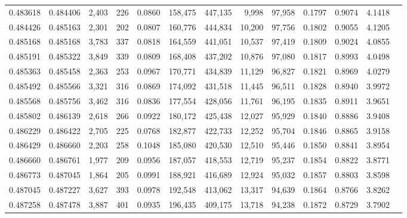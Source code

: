 \begin{tabular}{rrrrrrrrrrrrr}
0.483618 & 0.484406 & 2,403 &   226 &                                     0.0860 & 158,475 & 447,135 &   9,998 &  97,958 & 0.1797 & 0.9074 & 4.1418 \\
0.484426 & 0.485163 & 2,301 &   202 &                                     0.0807 & 160,776 & 444,834 &  10,200 &  97,756 & 0.1802 & 0.9055 & 4.1205 \\
0.485168 & 0.485168 & 3,783 &   337 &                                     0.0818 & 164,559 & 441,051 &  10,537 &  97,419 & 0.1809 & 0.9024 & 4.0855 \\
0.485191 & 0.485322 & 3,849 &   339 &                                     0.0809 & 168,408 & 437,202 &  10,876 &  97,080 & 0.1817 & 0.8993 & 4.0498 \\
0.485363 & 0.485458 & 2,363 &   253 &                                     0.0967 & 170,771 & 434,839 &  11,129 &  96,827 & 0.1821 & 0.8969 & 4.0279 \\
0.485492 & 0.485566 & 3,321 &   316 &                                     0.0869 & 174,092 & 431,518 &  11,445 &  96,511 & 0.1828 & 0.8940 & 3.9972 \\
0.485568 & 0.485756 & 3,462 &   316 &                                     0.0836 & 177,554 & 428,056 &  11,761 &  96,195 & 0.1835 & 0.8911 & 3.9651 \\
0.485802 & 0.486139 & 2,618 &   266 &                                     0.0922 & 180,172 & 425,438 &  12,027 &  95,929 & 0.1840 & 0.8886 & 3.9408 \\
0.486229 & 0.486422 & 2,705 &   225 &                                     0.0768 & 182,877 & 422,733 &  12,252 &  95,704 & 0.1846 & 0.8865 & 3.9158 \\
0.486429 & 0.486660 & 2,203 &   258 &                                     0.1048 & 185,080 & 420,530 &  12,510 &  95,446 & 0.1850 & 0.8841 & 3.8954 \\
0.486660 & 0.486761 & 1,977 &   209 &                                     0.0956 & 187,057 & 418,553 &  12,719 &  95,237 & 0.1854 & 0.8822 & 3.8771 \\
0.486773 & 0.487045 & 1,864 &   205 &                                     0.0991 & 188,921 & 416,689 &  12,924 &  95,032 & 0.1857 & 0.8803 & 3.8598 \\
0.487045 & 0.487227 & 3,627 &   393 &                                     0.0978 & 192,548 & 413,062 &  13,317 &  94,639 & 0.1864 & 0.8766 & 3.8262 \\
0.487258 & 0.487478 & 3,887 &   401 &                                     0.0935 & 196,435 & 409,175 &  13,718 &  94,238 & 0.1872 & 0.8729 & 3.7902 \\

\end{tabular}
